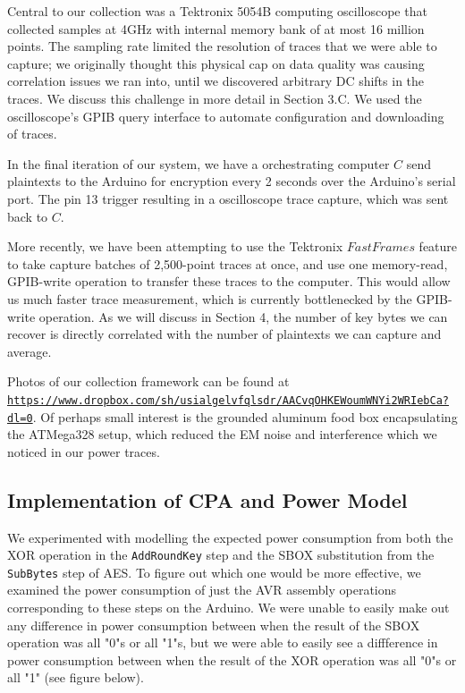 \documentclass[journal]{ieee_style}
\begin{document}
Central to our collection was a Tektronix 5054B computing oscilloscope that collected samples at 4GHz with internal memory bank of at most 16 million points. The sampling rate limited the resolution of traces that we were able to capture; we originally thought this physical cap on data quality was causing correlation issues we ran into, until we discovered arbitrary DC shifts in the traces. We discuss this challenge in more detail in Section 3.C. We used the oscilloscope's GPIB query interface to automate configuration and downloading of traces.

In the final iteration of our system, we have a orchestrating computer $C$ send plaintexts to the Arduino for encryption every 2 seconds over the Arduino's serial port. The pin 13 trigger resulting in a oscilloscope trace capture, which was sent back to $C$. 

More recently, we have been attempting to use the Tektronix $Fast Frames$ feature to take capture batches of 2,500-point traces at once, and use one memory-read, GPIB-write operation to transfer these traces to the computer. This would allow us much faster trace measurement, which is currently bottlenecked by the GPIB-write operation. As we will discuss in Section 4, the number of key bytes we can recover is directly correlated with the number of plaintexts we can capture and average.

Photos of our collection framework can be found at \texttt{\url{https://www.dropbox.com/sh/usialgelvfqlsdr/AACvqOHKEWoumWNYi2WRIebCa?dl=0}}. Of perhaps small interest is the grounded aluminum food box encapsulating the ATMega328 setup, which reduced the EM noise and interference which we noticed in our power traces.

\subsection{Implementation of CPA and Power Model}

We experimented with modelling the expected power consumption from both the XOR operation in the \texttt{AddRoundKey} step and the SBOX substitution from the \texttt{SubBytes} step of AES. To figure out which one would be more effective, we examined the power consumption of just the AVR assembly operations corresponding to these steps on the Arduino. We were unable to easily make out any difference in power consumption between when the result of the SBOX operation was all "0"s or all "1"s, but we were able to easily see a diffference in power consumption between when the result of the XOR operation was all "0"s or all "1" (see figure below).
\end{document}
